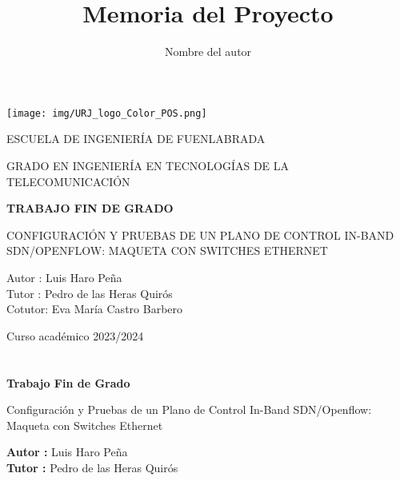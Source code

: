 \documentclass[a4paper, 12pt]{book}
\title{Memoria del Proyecto}
\author{Nombre del autor}
\begin{document}
	
	\renewcommand{\refname}{Bibliografía}  %
	\renewcommand{\appendixname}{Apéndice}
	
	
	
	\begin{titlepage}
		\begin{center}
			\texttt{[image: img/URJ\_logo\_Color\_POS.png]}
			
			\vspace{1.75cm}
			
			\LARGE
			ESCUELA DE INGENIERÍA DE FUENLABRADA
			\vspace{1cm}
			
			\LARGE
			GRADO EN INGENIERÍA EN TECNOLOGÍAS DE LA TELECOMUNICACIÓN
			
			\vspace{1cm}
			\LARGE
			\textbf{TRABAJO FIN DE GRADO}
			
			\vspace{1cm}
			
			\Large
			CONFIGURACIÓN Y PRUEBAS DE UN PLANO DE CONTROL IN-BAND SDN/OPENFLOW: MAQUETA CON SWITCHES ETHERNET  
			
			\vspace{2cm}
			
			\large
			Autor : Luis Haro Peña \\
			Tutor : Pedro de las Heras Quirós\\
			Cotutor: Eva María Castro Barbero
			\vspace{1cm}
			
			\large
			Curso académico 2023/2024
			
		\end{center}
	\end{titlepage}
	
	\newpage
	\mbox{}
	\thispagestyle{empty} %
	
	
	
	\clearpage
	\chapter*{}
	
	\vspace{-4cm}
	\begin{center}
		\LARGE
		\textbf{Trabajo Fin de Grado}
		
		\vspace{1cm}
		\large
		Configuración y Pruebas de un Plano de Control In-Band SDN/Openflow: Maqueta con Switches Ethernet
		
		\vspace{1cm}
		\large
		\textbf{Autor :} Luis Haro Peña \\
		\textbf{Tutor :} Pedro de las Heras Quirós
		
	\end{center}
	
\end{document}

